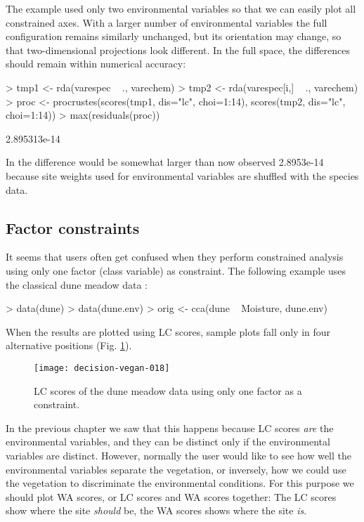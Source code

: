 \documentclass[a4paper,10pt,twocolumn]{article}
\begin{document}
The example used only two environmental variables so that we can
easily plot all constrained axes.  With a larger number of
environmental variables the full configuration remains similarly
unchanged, but its orientation may change, so that two-dimensional
projections look different.  In the full space, the differences should
remain within numerical accuracy:
\begin{Schunk}
\begin{Sinput}
> tmp1 <- rda(varespec ~ ., varechem)
> tmp2 <- rda(varespec[i,] ~ ., varechem)
> proc <- procrustes(scores(tmp1, dis="lc", choi=1:14), 
                     scores(tmp2, dis="lc", choi=1:14))
> max(residuals(proc))
\end{Sinput}
\begin{Soutput}
[1] 2.895313e-14
\end{Soutput}
\end{Schunk}
In  the difference would be somewhat larger than now
observed 2.8953e-14 because site
weights used for environmental variables are shuffled with the species
data.

\subsection{Factor constraints}

It seems that users often get confused when they perform constrained
analysis using  only one factor (class variable) as constraint.  The
following example uses the classical dune meadow data \cite{Jongman87}:
\begin{Schunk}
\begin{Sinput}
> data(dune)
> data(dune.env)
> orig <- cca(dune ~ Moisture, dune.env)
\end{Sinput}
\end{Schunk}
When the results are plotted using LC scores, sample plots fall only
in four alternative positions (Fig. \ref{fig:factorlc}).
\begin{figure}
\texttt{[image: decision-vegan-018]}
\caption{LC scores of the dune meadow data using only one factor as a
  constraint.}
\label{fig:factorlc}
\end{figure}
In the previous chapter we saw that this happens because LC scores
\emph{are} the environmental variables, and they can be distinct only
if the environmental variables are distinct.  However, normally the user
would like to see how well the environmental variables separate the
vegetation, or inversely, how we could use the vegetation to
discriminate the environmental conditions.  For this purpose we should
plot WA scores, or LC scores and WA scores together:  The LC scores
show where the site \emph{should} be, the WA scores shows where the
site \emph{is}.
\end{document}
